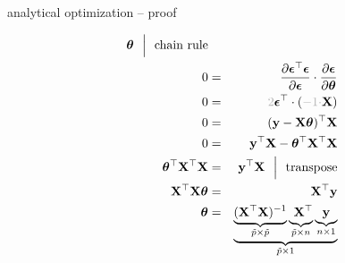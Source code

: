 \documentclass[11pt,compress,t,notes=noshow, xcolor=table]{beamer}
\begin{document}
\begin{vbframe}{analytical optimization -- proof}
\begin{minipage}[t]{0.45\textwidth}
\begin{eqnarray*}
{        \thetab} 
        ~~ \Big \rvert ~~ \text{chain rule} \\
        0 &=& \frac{\partial \bm{\epsilon}^\top \bm{\epsilon}}{\partial 
        \bm{\epsilon}} \cdot \frac{\partial \bm{\epsilon}}{\partial \thetab} \\
        0 &=& \textcolor{black!30}{2}  \bm{\epsilon}^\top \cdot (
        \textcolor{black!30}{-1 \cdot} \Xmat) \\
        0 &=& (\yv - \Xmat \thetab)^\top \Xmat \\
        0 &=& \yv^\top \Xmat - \thetab^\top \Xmat^\top \Xmat \\
        \thetab^\top \Xmat^\top \Xmat &=& \yv^\top \Xmat 
        ~~ \Big \rvert ~~ \text{transpose} \\
        \Xmat^\top \Xmat \thetab &=& \Xmat^\top \yv \\
        \thetab &=& \underbrace{
        \underbrace{(\Xmat^\top \Xmat)^{-1}}_{\tilde p \times \tilde p}
        \underbrace{\phantom{(} \Xmat^\top}_{\tilde p \times n} 
        \underbrace{\yv}_{n \times 1}}_{\tilde p \times 1}
    \end{eqnarray*}
\end{minipage}

\end{vbframe}


\endlecture
\end{document}
